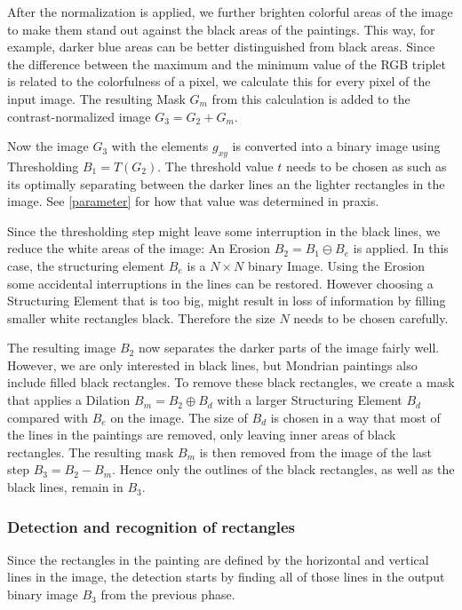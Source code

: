 \documentclass[serif,article,noparskip]{agse-thesis}
\begin{document}
After the normalization is applied, we further brighten colorful areas of the
image to make them stand out against the black areas of the paintings. This way,
for example, darker blue areas can be better distinguished from black areas.
Since the difference between the maximum and the minimum value of the RGB
triplet is related to the colorfulness of a pixel, we calculate this for every
pixel of the input image. The resulting Mask $G_m$ from this calculation is added to
the contrast-normalized image $G_3 = G_2 + G_m$.

Now the image $G_3$ with the elements $g_{xy}$ is converted into a binary image
using Thresholding $B_1 = T(G_2)$. The threshold value $t$ needs to be chosen
as such as its optimally separating between the darker lines an the lighter
rectangles in the image. See \ref{parameter} for how that value was determined
in praxis.

Since the thresholding step might leave some interruption in the black lines, we
reduce the white areas of the image: An Erosion $B_2 = B_1 \ominus B_e$ is
applied. In this case, the structuring element $B_e$ is a $N\times N$ binary
Image. Using the Erosion some accidental interruptions in the lines can be
restored. However choosing a Structuring Element that is too big, might
result in loss of information by filling smaller white rectangles black.
Therefore the size $N$ needs to be chosen carefully.

The resulting image $B_2$ now separates the darker parts of the image fairly
well. However, we are only interested in black lines, but Mondrian paintings
also include filled black rectangles. To remove these black rectangles, we
create a mask that applies a Dilation $B_m = B_2 \oplus B_d$ with a larger
Structuring Element $B_d$ compared with $B_e$ on the image. The size of $B_d$ is
chosen in a way that most of the lines in the paintings are removed, only
leaving inner areas of black rectangles. The resulting mask $B_m$ is then
removed from the image of the last step $B_3 = B_2 - B_m$. Hence only the
outlines of the black rectangles, as well as the black lines, remain in $B_3$.

\subsubsection{Detection and recognition of rectangles} \label{rectangles}

Since the rectangles in the painting are defined by the horizontal and
vertical lines in the image, the detection starts by finding all of those lines
in the output binary image $B_3$ from the previous phase.
\end{document}
